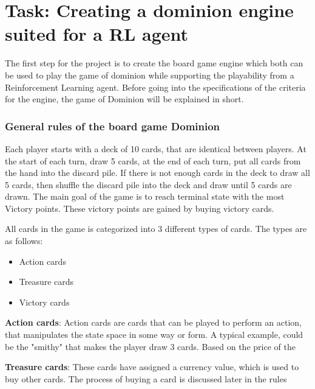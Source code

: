 \chapter{Task: Creating a dominion engine suited for a RL agent} \label{ch:Dominion_engine}
The first step for the project is to create the board game engine which both can be used to play the game of dominion while supporting the playability from a Reinforcement Learning agent. 
Before going into the specifications of the criteria for the engine, the game of Dominion will be explained in short.

\subsection{General rules of the board game Dominion}
Each player starts with a deck of 10 cards, that are identical between players. At the start of each turn, draw 5 cards, at the end of each turn, put all cards from the hand into the discard pile. If there is not enough cards in the deck to draw all 5 cards, then shuffle the discard pile into the deck and draw until 5 cards are drawn. The main goal of the game is to reach terminal state with the most Victory points. These victory points are gained by buying victory cards. 

All cards in the game is categorized into 3 different types of cards. The types are as follows:

\begin{itemize}
    \item Action cards
    \item Treasure cards
    \item Victory cards
\end{itemize}

\textbf{Action cards}:
Action cards are cards that can be played to perform an action, that manipulates the state space in some way or form. A typical example, could be the "smithy" that makes the player draw 3 cards. Based on the price of the

\textbf{Treasure cards}:
These cards have assigned a currency value, which is used to buy other cards. The process of buying a card is discussed later in the rules

